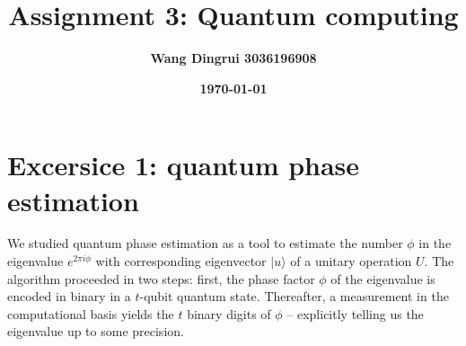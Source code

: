 \documentclass[12pt]{article}
\title{\textbf{Assignment 3: Quantum computing}}
\author{\textbf{Wang Dingrui 3036196908}}
\date{\textbf{\today}}
\begin{document}
\maketitle

\section{Excersice 1: quantum phase estimation}
We studied quantum phase estimation as a tool to estimate the number $\phi$ in the eigenvalue $e^{2\pi i\phi}$ with corresponding eigenvector $|u\rangle$ of a unitary operation $U$. The algorithm proceeded in two steps: first, the phase factor $\phi$ of the eigenvalue is encoded in binary in a $t$-qubit quantum state. Thereafter, a measurement in the computational basis yields the $t$ binary digits of $\phi$ – explicitly telling us the eigenvalue up to some precision.
\end{document}
